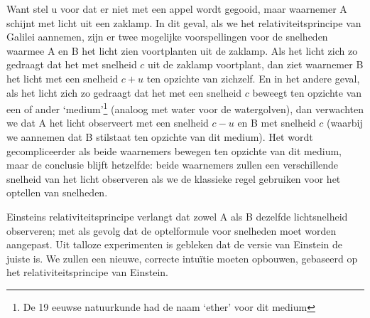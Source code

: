 Want stel u voor dat er niet met een appel wordt gegooid, maar
waarnemer A schijnt met licht uit een zaklamp. In dit geval, als we
het relativiteitsprincipe van Galilei aannemen, zijn er twee mogelijke
voorspellingen voor de snelheden waarmee A en B het licht zien
voortplanten uit de zaklamp. Als het licht zich zo gedraagt dat het
met snelheid $c$ uit de zaklamp voortplant, dan ziet waarnemer B het
licht met een snelheid $c+u$ ten opzichte van zichzelf. En in het andere geval, als het
licht zich zo gedraagt dat het met een snelheid $c$ beweegt ten
opzichte van een of ander `medium'\footnote{De 19 eeuwse natuurkunde
had de naam `ether' voor dit medium} (analoog met water voor de
watergolven), dan verwachten we dat A het licht observeert met een
snelheid $c-u$ en B met snelheid $c$ (waarbij we aannemen dat B
stilstaat ten opzichte van dit medium). Het wordt gecompliceerder als
beide waarnemers bewegen ten opzichte van dit medium, maar de
conclusie blijft hetzelfde: beide waarnemers zullen een verschillende
snelheid van het licht observeren als we de klassieke regel gebruiken
voor het optellen van snelheden.

Einsteins relativiteitsprincipe verlangt dat zowel A als B dezelfde
lichtsnelheid observeren; met als gevolg dat de optelformule voor
snelheden moet worden aangepast. Uit talloze experimenten is
gebleken dat de versie van Einstein de juiste is. We zullen een nieuwe,
correcte intu\"itie moeten opbouwen, gebaseerd op het
relativiteitsprincipe van Einstein.











